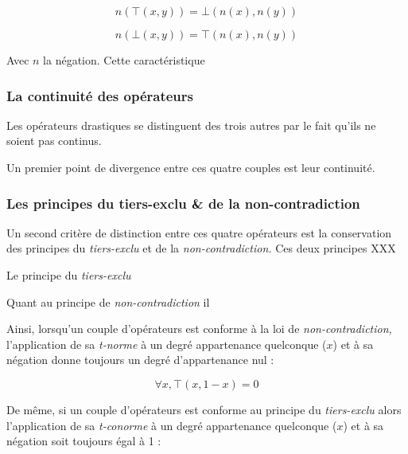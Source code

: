 \begin{equation}
  n\left(⊤(x,y)\right) = ⊥\left(n(x), n(y)\right)
\end{equation}

\begin{equation}
  n\left(⊥(x,y)\right) = ⊤\left(n(x), n(y)\right)
\end{equation}

Avec \(n\) la négation. Cette caractéristique



\subsubsection{La continuité des opérateurs}

Les opérateurs drastiques se distinguent des trois autres par le fait
qu'ils ne soient pas continus.


Un premier point de divergence entre ces quatre couples est leur
continuité.



\subsubsection{Les principes du tiers-exclu \& de la non-contradiction}

Un second critère de distinction entre ces quatre opérateurs est la
conservation des principes du \emph{tiers-exclu} et de la
\emph{non-contradiction.} Ces deux principes XXX

Le principe du \emph{tiers-exclu}

Quant au principe de \emph{non-contradiction} il


Ainsi, lorsqu'un couple d'opérateurs est conforme à la loi de
\emph{non-contradiction,} l’application de sa \emph{t-norme} à un
degré appartenance quelconque (\(x\)) et à sa négation donne toujours un
degré d'appartenance nul : 

\begin{equation}
  \forall x, ⊤(x,1-x) = 0
\end{equation}

De même, si un couple d'opérateurs est conforme au principe du
\emph{tiers-exclu} alors l’application de sa \emph{t-conorme} à un
degré appartenance quelconque (\(x\))  et à sa négation soit
toujours égal à 1 :

